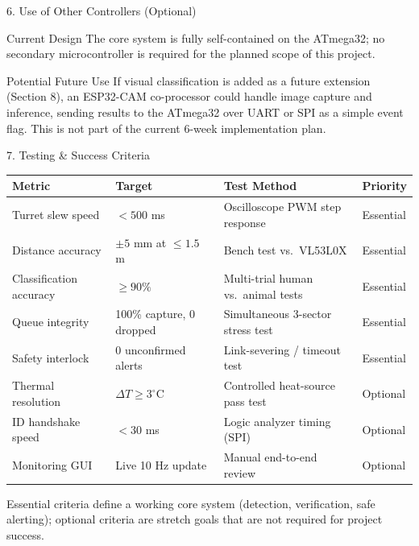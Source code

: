 \documentclass[aspectratio=169, 10pt]{beamer}
\begin{document}
\begin{frame}{6. Use of Other Controllers (Optional)}
    \begin{block}{Current Design}
        \small The core system is fully self-contained on the ATmega32; no secondary microcontroller is required for the planned scope of this project.
    \end{block}
    \begin{block}{Potential Future Use}
        \small If visual classification is added as a future extension (Section 8), an ESP32-CAM co-processor could handle image capture and inference, sending results to the ATmega32 over UART or SPI as a simple event flag. This is not part of the current 6-week implementation plan.
    \end{block}
\end{frame}

\begin{frame}{7. Testing \& Success Criteria}
    \scriptsize
    \begin{table}
        \centering
        \color{TextInk}
        \begin{tabular}{llll}
            \toprule
            \textbf{\color{AmberAccent} Metric} & \textbf{\color{AmberAccent} Target} & \textbf{\color{AmberAccent} Test Method} & \textbf{\color{AmberAccent} Priority} \\
            \midrule
            Turret slew speed & $< 500$ ms & Oscilloscope PWM step response & Essential \\
            Distance accuracy & $\pm 5$ mm at $\le 1.5$ m & Bench test vs.\ VL53L0X & Essential \\
            Classification accuracy & $\ge 90\%$ & Multi-trial human vs.\ animal tests & Essential \\
            Queue integrity & 100\% capture, 0 dropped & Simultaneous 3-sector stress test & Essential \\
            Safety interlock & 0 unconfirmed alerts & Link-severing / timeout test & Essential \\
            Thermal resolution & $\Delta T \ge 3^\circ\text{C}$ & Controlled heat-source pass test & Optional \\
            ID handshake speed & $< 30$ ms & Logic analyzer timing (SPI) & Optional \\
            Monitoring GUI & Live 10 Hz update & Manual end-to-end review & Optional \\
            \bottomrule
        \end{tabular}
    \end{table}
    \vspace{0.2cm}
    \footnotesize Essential criteria define a working core system (detection, verification, safe alerting); optional criteria are stretch goals that are not required for project success.
\end{frame}
\end{document}
